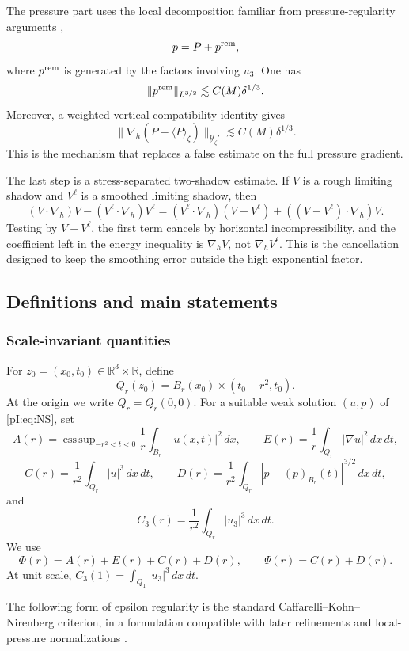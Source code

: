\documentclass[11pt]{article}
\numberwithin{equation}{section}
\theoremstyle{plain}
\theoremstyle{definition}
\theoremstyle{remark}
\DeclareMathOperator*{\esssup}{ess\,sup}
\newcommand{\R}{\mathbb R}
\newcommand{\nabh}{\nabla_h}
\newcommand{\calY}{\mathcal Y}
\begin{document}
The pressure part uses the local decomposition familiar from pressure-regularity arguments \cite{SohrWahl1986,Seregin2015,Wolf2017},
\[
        p=P+p^{\rm rem},
\]
where \(p^{\rm rem}\) is generated by the factors involving \(u_3\).  One has
\[
        \|p^{\rm rem}\|_{L^{3/2}}\lesssim C(M)\delta^{1/3}.
\]
Moreover, a weighted vertical compatibility identity gives
\[
        \|\nabh(P-\langle P\rangle_\zeta)\|_{\calY_\zeta'}
        \lesssim C(M)\delta^{1/3}.
\]
This is the mechanism that replaces a false estimate on the full pressure gradient.

The last step is a stress-separated two-shadow estimate.  If \(V\) is a rough limiting shadow and \(V^\ell\) is a smoothed limiting shadow, then
\[
        (V\cdot\nabh)V-(V^\ell\cdot\nabh)V^\ell
        =(V^\ell\cdot\nabh)(V-V^\ell)+((V-V^\ell)\cdot\nabh)V.
\]
Testing by \(V-V^\ell\), the first term cancels by horizontal incompressibility, and the coefficient left in the energy inequality is \(\nabh V\), not \(\nabh V^\ell\).  This is the cancellation designed to keep the smoothing error outside the high exponential factor.

\subsection{Definitions and main statements}\label{pI:sec:main-statements}

\subsubsection{Scale-invariant quantities}

For \(z_0=(x_0,t_0)\in\R^3\times\R\), define
\[
        Q_r(z_0)=B_r(x_0)\times(t_0-r^2,t_0).
\]
At the origin we write \(Q_r=Q_r(0,0)\).  For a suitable weak solution \((u,p)\) of \eqref{pI:eq:NS}, set
\[
A(r)=\esssup_{-r^2<t<0}\frac1r\int_{B_r}|u(x,t)|^2\,dx,
\qquad
E(r)=\frac1r\int_{Q_r}|\nabla u|^2\,dx\,dt,
\]
\[
C(r)=\frac1{r^2}\int_{Q_r}|u|^3\,dx\,dt,
\qquad
D(r)=\frac1{r^2}\int_{Q_r}|p-(p)_{B_r}(t)|^{3/2}\,dx\,dt,
\]
and
\[
        C_3(r)=\frac1{r^2}\int_{Q_r}|u_3|^3\,dx\,dt.
\]
We use
\[
        \Phi(r)=A(r)+E(r)+C(r)+D(r),
        \qquad
        \Psi(r)=C(r)+D(r).
\]
At unit scale, \(C_3(1)=\int_{Q_1}|u_3|^3\,dx\,dt\).

The following form of epsilon regularity is the standard Caffarelli--Kohn--Nirenberg criterion, in a formulation compatible with later refinements and local-pressure normalizations \cite{CKN1982,Lin1998,LadyzhenskayaSeregin1999,Seregin2007Local,GuevaraPhuc2017}.
\end{document}
